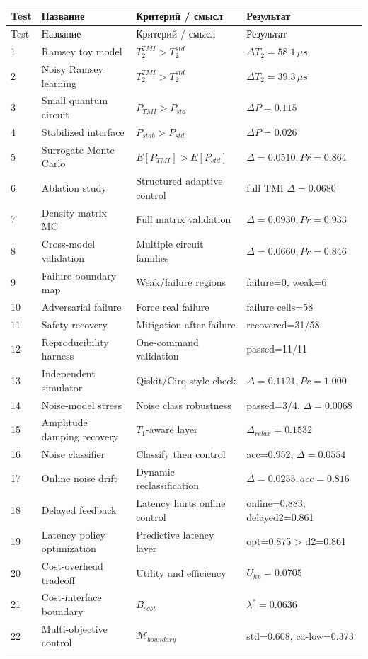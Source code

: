 \documentclass[12pt,a4paper]{article}
\begin{document}
\begin{longtable}{p{1.0cm}p{4.2cm}p{5.0cm}p{5.1cm}}
\toprule
Test & Название & Критерий / смысл & Результат \\
\midrule
\endfirsthead
\toprule
Test & Название & Критерий / смысл & Результат \\
\midrule
\endhead
1 & Ramsey toy model & $T_2^{TMI}>T_2^{std}$ & $\Delta T_2=58.1\,\mu s$ \\
2 & Noisy Ramsey learning & $T_2^{TMI}>T_2^{std}$ & $\Delta T_2=39.3\,\mu s$ \\
3 & Small quantum circuit & $P_{TMI}>P_{std}$ & $\Delta P=0.115$ \\
4 & Stabilized interface & $P_{stab}>P_{std}$ & $\Delta P=0.026$ \\
5 & Surrogate Monte Carlo & $E[P_{TMI}]>E[P_{std}]$ & $\Delta=0.0510, Pr=0.864$ \\
6 & Ablation study & Structured adaptive control & full TMI $\Delta=0.0680$ \\
7 & Density-matrix MC & Full matrix validation & $\Delta=0.0930, Pr=0.933$ \\
8 & Cross-model validation & Multiple circuit families & $\Delta=0.0660, Pr=0.846$ \\
9 & Failure-boundary map & Weak/failure regions & failure=0, weak=6 \\
10 & Adversarial failure & Force real failure & failure cells=58 \\
11 & Safety recovery & Mitigation after failure & recovered=31/58 \\
12 & Reproducibility harness & One-command validation & passed=11/11 \\
13 & Independent simulator & Qiskit/Cirq-style check & $\Delta=0.1121, Pr=1.000$ \\
14 & Noise-model stress & Noise class robustness & passed=3/4, $\Delta=0.0068$ \\
15 & Amplitude damping recovery & $T_1$-aware layer & $\Delta_{relax}=0.1532$ \\
16 & Noise classifier & Classify then control & acc=0.952, $\Delta=0.0554$ \\
17 & Online noise drift & Dynamic reclassification & $\Delta=0.0255, acc=0.816$ \\
18 & Delayed feedback & Latency hurts online control & online=0.883, delayed2=0.861 \\
19 & Latency policy optimization & Predictive latency layer & opt=0.875 > d2=0.861 \\
20 & Cost-overhead tradeoff & Utility and efficiency & $U_{hp}=0.0705$ \\
21 & Cost-interface boundary & $B_{cost}$ & $\lambda^*=0.0636$ \\
22 & Multi-objective control & $\mathcal{{M}}_{boundary}$ & std=0.608, ca-low=0.373 \\
\bottomrule
\end{longtable}
\end{document}
